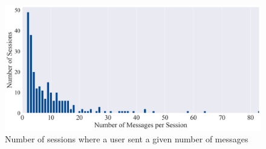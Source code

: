 \begin{figure}[H]
    \centering
    \includegraphics[width=1\textwidth]{results/plots/assets/usage-13-number-of-sessions-with-number-of-messages.png}
    \caption{Number of sessions where a user sent a given number of messages}
    \label{fig:usage_13_number_of_sessions_with_number_of_messages}
\end{figure}